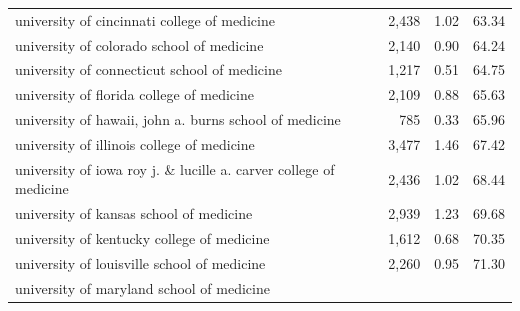 \begin{table}[!h]
\begin{tabular}{llll}
\multicolumn{1}{l}{\hspace{1em}university of cincinnati college of medicine} &
  \multicolumn{1}{r}{2,438} &
  \multicolumn{1}{r}{1.02} &
  \multicolumn{1}{r}{63.34} \\
\multicolumn{1}{l}{\hspace{1em}university of colorado school of medicine} &
  \multicolumn{1}{r}{2,140} &
  \multicolumn{1}{r}{0.90} &
  \multicolumn{1}{r}{64.24} \\
\multicolumn{1}{l}{\hspace{1em}university of connecticut school of medicine} &
  \multicolumn{1}{r}{1,217} &
  \multicolumn{1}{r}{0.51} &
  \multicolumn{1}{r}{64.75} \\
\multicolumn{1}{l}{\hspace{1em}university of florida college of medicine} &
  \multicolumn{1}{r}{2,109} &
  \multicolumn{1}{r}{0.88} &
  \multicolumn{1}{r}{65.63} \\
\multicolumn{1}{l}{\hspace{1em}university of hawaii, john a. burns school of medicine} &
  \multicolumn{1}{r}{785} &
  \multicolumn{1}{r}{0.33} &
  \multicolumn{1}{r}{65.96} \\
\multicolumn{1}{l}{\hspace{1em}university of illinois college of medicine} &
  \multicolumn{1}{r}{3,477} &
  \multicolumn{1}{r}{1.46} &
  \multicolumn{1}{r}{67.42} \\
\multicolumn{1}{l}{\hspace{1em}university of iowa roy j. \& lucille a. carver college of medicine} &
  \multicolumn{1}{r}{2,436} &
  \multicolumn{1}{r}{1.02} &
  \multicolumn{1}{r}{68.44} \\
\multicolumn{1}{l}{\hspace{1em}university of kansas school of medicine} &
  \multicolumn{1}{r}{2,939} &
  \multicolumn{1}{r}{1.23} &
  \multicolumn{1}{r}{69.68} \\
\multicolumn{1}{l}{\hspace{1em}university of kentucky college of medicine} &
  \multicolumn{1}{r}{1,612} &
  \multicolumn{1}{r}{0.68} &
  \multicolumn{1}{r}{70.35} \\
\multicolumn{1}{l}{\hspace{1em}university of louisville school of medicine} &
  \multicolumn{1}{r}{2,260} &
  \multicolumn{1}{r}{0.95} &
  \multicolumn{1}{r}{71.30} \\
\multicolumn{1}{l}{\hspace{1em}university of maryland school of medicine} &

\end{tabular}
\end{table}
